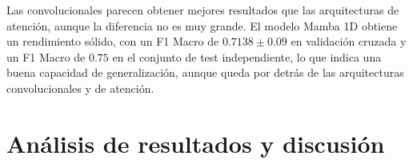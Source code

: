 Las convolucionales parecen obtener mejores resultados que las arquitecturas de atención, aunque la diferencia no es muy grande.
El modelo Mamba 1D obtiene un rendimiento sólido, con un F1 Macro de $0.7138 \pm 0.09$ en validación cruzada y un F1 Macro de $0.75$ en el conjunto de test independiente,
lo que indica una buena capacidad de generalización, aunque queda por detrás de las arquitecturas convolucionales y de atención.

\section{Análisis de resultados y discusión}
\label{sec:analisis_resultados}




